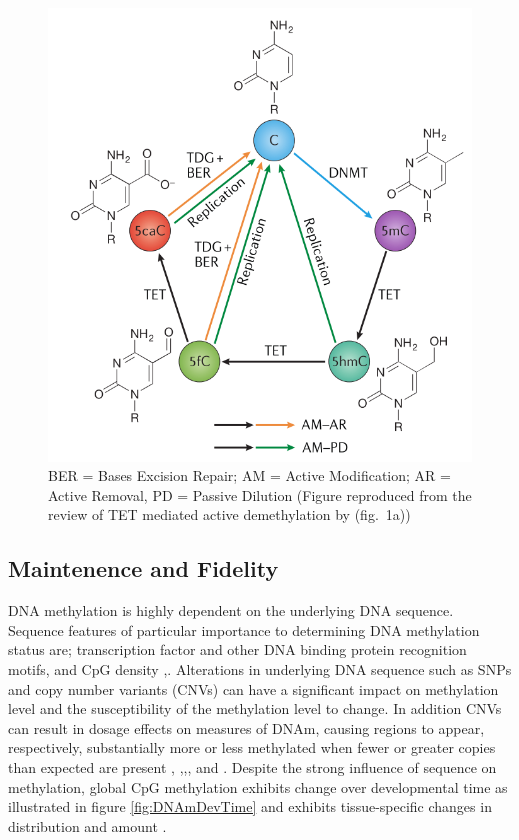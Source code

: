 \documentclass[
]{book}
\begin{document}
\begin{figure}

{\centering \includegraphics[width=0.6\linewidth]{figs/Wu2017TETsDNAmCycle} 

}

\caption{BER = Bases Excision Repair; AM = Active Modification; AR = Active Removal, PD = Passive Dilution (Figure reproduced from the review of TET mediated active demethylation by \citet{Wu2017} (fig.~1a))}\label{fig:Wu2017TETsDNAmCycle}
\end{figure}



\hypertarget{maintenence-and-fidelity}{%
\subsection{Maintenence and Fidelity}\label{maintenence-and-fidelity}}

DNA methylation is highly dependent on the underlying DNA sequence. Sequence features of particular importance to determining DNA methylation status are; transcription factor and other DNA binding protein recognition motifs, and CpG density \citep{Lienert2011},\citep{Ziller2013}. Alterations in underlying DNA sequence such as SNPs and copy number variants (CNVs) can have a significant impact on methylation level and the susceptibility of the methylation level to change. In addition CNVs can result in dosage effects on measures of DNAm, causing regions to appear, respectively, substantially more or less methylated when fewer or greater copies than expected are present \citep{Boks2009}, \citep{Kerkel2008},\citep{Schalkwyk2010},\citep{Shoemaker2010}, and \citep{Bell2017a}. Despite the strong influence of sequence on methylation, global CpG methylation exhibits change over developmental time as illustrated in figure \ref{fig:DNAmDevTime} and exhibits tissue-specific changes in distribution and amount \citep{Ziller2013}.
\end{document}
